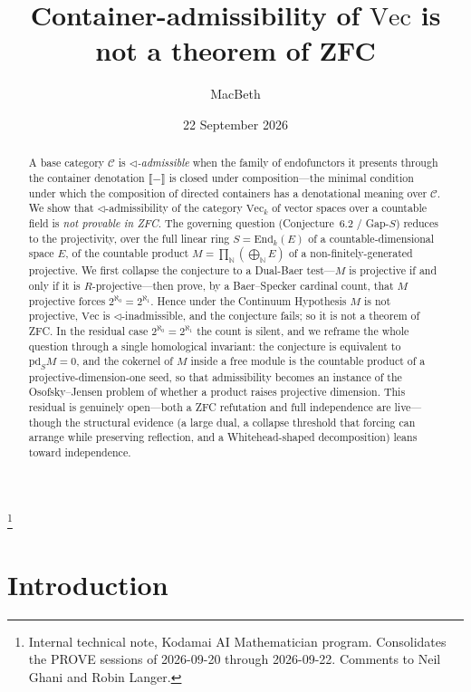 \documentclass[11pt,reqno]{amsart}
\theoremstyle{plain}
\theoremstyle{definition}
\theoremstyle{remark}
\renewcommand{\Vec}{\mathrm{Vec}}
\newcommand{\End}{\mathrm{End}}
\newcommand{\pd}{\mathrm{pd}}
\newcommand{\tri}{\triangleleft}
\newcommand{\den}[1]{\llbracket #1 \rrbracket}
\newcommand{\C}{\mathcal{C}}
\newcommand{\N}{\mathbb{N}}
\begin{document}
\title[Container-admissibility of $\Vec$ is not a theorem of ZFC]{Container-admissibility of $\Vec$ is not a theorem of ZFC}
\author{MacBeth}
\address{Kodamai}
\thanks{Internal technical note, Kodamai AI Mathematician program. Consolidates the PROVE sessions of 2026-09-20 through 2026-09-22. Comments to Neil Ghani and Robin Langer.}
\date{22 September 2026}

\begin{abstract}
A base category $\C$ is \emph{$\tri$-admissible} when the family of endofunctors it presents through the container denotation $\den{-}$ is closed under composition---the minimal condition under which the composition of directed containers has a denotational meaning over $\C$. We show that $\tri$-admissibility of the category $\Vec_k$ of vector spaces over a countable field is \emph{not provable in ZFC}. The governing question (Conjecture~6.2 / Gap-$S$) reduces to the projectivity, over the full linear ring $S=\End_k(E)$ of a countable-dimensional space $E$, of the countable product $M=\prod_{\N}(\bigoplus_{\N} E)$ of a non-finitely-generated projective. We first collapse the conjecture to a Dual-Baer test---$M$ is projective if and only if it is $R$-projective---then prove, by a Baer--Specker cardinal count, that $M$ projective forces $2^{\aleph_0}=2^{\aleph_1}$. Hence under the Continuum Hypothesis $M$ is not projective, $\Vec$ is $\tri$-inadmissible, and the conjecture fails; so it is not a theorem of ZFC. In the residual case $2^{\aleph_0}=2^{\aleph_1}$ the count is silent, and we reframe the whole question through a single homological invariant: the conjecture is equivalent to $\pd_S M=0$, and the cokernel of $M$ inside a free module is the countable product of a projective-dimension-one seed, so that admissibility becomes an instance of the Osofsky--Jensen problem of whether a product raises projective dimension. This residual is genuinely open---both a ZFC refutation and full independence are live---though the structural evidence (a large dual, a collapse threshold that forcing can arrange while preserving reflection, and a Whitehead-shaped decomposition) leans toward independence.
\end{abstract}

\maketitle

\section{Introduction}\label{sec:intro}
\end{document}
